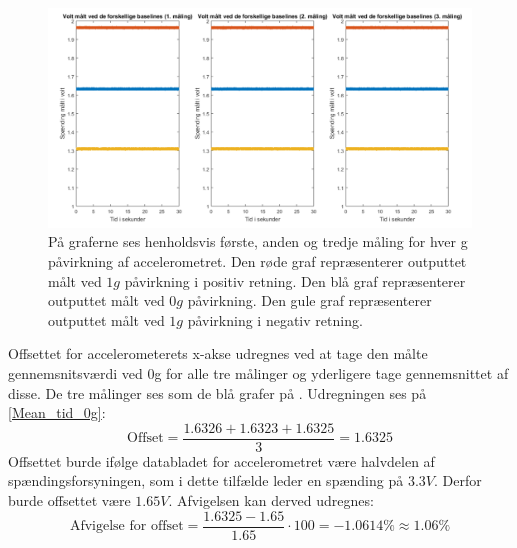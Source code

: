 \begin{figure}[H]
	\centering
	\includegraphics[scale=0.45]{figures/cProblemloesning/Pilotforsoeg_Tid.png}
	\caption{På graferne ses henholdsvis første, anden og tredje måling for hver g påvirkning af accelerometret. Den røde graf repræsenterer outputtet målt ved $1g$ påvirkning i positiv retning. Den blå graf repræsenterer outputtet målt ved $0g$ påvirkning. Den gule graf repræsenterer outputtet målt ved $1g$ påvirkning i negativ retning.}
	\label{Fig:Pilot_Tid}
\end{figure}

Offsettet for accelerometerets x-akse udregnes ved at tage den målte gennemsnitsværdi ved $0$g for alle tre målinger og yderligere tage gennemsnittet af disse. De tre målinger ses som de blå grafer på . Udregningen ses på \ref{Mean_tid_0g}:
\begin{equation}\label{Mean_tid_0g}
\text{Offset} = \frac{1.6326 + 1.6323 + 1.6325}{3} = 1.6325
\end{equation}
\noindent Offsettet burde ifølge databladet for accelerometret være halvdelen af spændingsforsyningen, som i dette tilfælde leder en spænding på $3.3V$. \cite{Devices2009} Derfor burde offsettet være $1.65V$. Afvigelsen kan derved udregnes:
\begin{equation}
\text{Afvigelse for offset} = \dfrac{1.6325 - 1.65}{1.65} \cdot 100 = -1.0614\% \approx 1.06\%
\end{equation}

